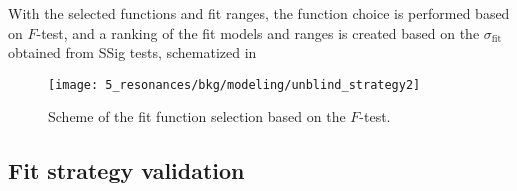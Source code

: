

With the selected functions and fit ranges, the function choice is performed based on \(F\)-test, and a ranking of the fit models and ranges is created based on the \(\sigma_{\text{fit}}\) obtained from \ac{SSig} tests, schematized in \Fig{\ref{fig:bkg:modeling:strategy:fitmodel_selection}}

\begin{figure}[ht!]
    \centering
    \texttt{[image: 5\_resonances/bkg/modeling/unblind\_strategy2]}
    \caption{Scheme of the fit function selection based on the \(F\)-test.}
    \label{fig:bkg:modeling:strategy:fitmodel_selection}
\end{figure}

































\subsection{Fit strategy validation}
\label{subsec:bkg:modeling:sigbkg}

